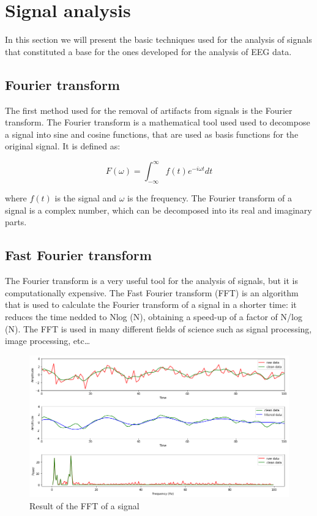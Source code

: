 \documentclass[a4paper]{sapthesis}
\begin{document}
\section{Signal analysis}
In this section we will present the basic techniques used for the analysis
of signals that 
constituted a base for the ones developed for the analysis of EEG data.
\subsection{Fourier transform}\label{sec:fourier}
The first method used for the removal of artifacts from signals is the
Fourier transform\cite{fourier}. The Fourier transform is a mathematical tool used
 used to decompose a signal into sine and cosine functions, that are 
used as basis functions for the original signal.
It is defined as:

\begin{equation}\label{eq:fourier}
F(\omega) = \int_{-\infty}^{\infty} f(t) e^{-i\omega t} dt
\end{equation}

where $f(t)$ is the signal and $\omega$ is the frequency. The Fourier
transform of a signal is a complex number, which can be decomposed into
its real and imaginary parts. 

\subsection{Fast Fourier transform}\label{sec:fft}
The Fourier transform is a very useful tool for the analysis of signals,
but it is computationally expensive. The Fast Fourier transform (FFT)\cite{fft} is
an algorithm that is used to calculate the Fourier transform
of a signal in a shorter time: it reduces the time nedded to Nlog (N),
 obtaining a speed-up of a factor of N/log (N).\newline
The FFT is used  in many different fields of science such as
signal processing, image processing, etc\ldots
\begin{figure}[h]
  \includegraphics[scale=0.45]{fft_waves_result}
  \centering
  \caption{Result of the FFT of a signal
  }\label{fig:fft}
  
  \end{figure}
\end{document}
